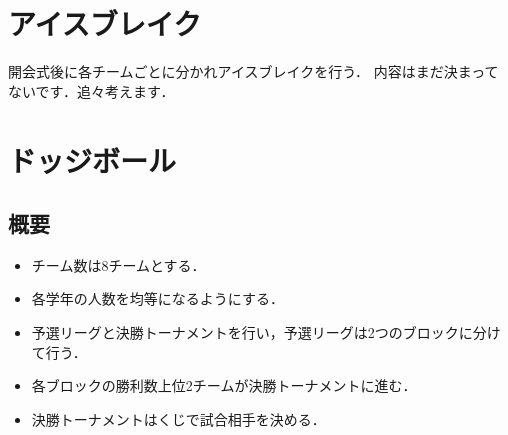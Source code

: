 \documentclass[dvipdfmx]{jsarticle}
\begin{document}

\section{アイスブレイク}
開会式後に各チームごとに分かれアイスブレイクを行う．
内容はまだ決まってないです．追々考えます．


\section{ドッジボール}
\subsection{概要}
\begin{itemize}
  \item チーム数は8チームとする．
  \item 各学年の人数を均等になるようにする．
  \item 予選リーグと決勝トーナメントを行い，予選リーグは2つのブロックに分けて行う．
  \item 各ブロックの勝利数上位2チームが決勝トーナメントに進む．
  \item 決勝トーナメントはくじで試合相手を決める．
\end{itemize}
\end{document}
